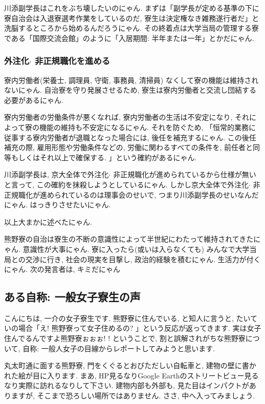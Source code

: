 \documentclass[10pt,b5jsbook,dvips,dvipdfmx,openany]{jsbook}
\theoremstyle{definition}
\begin{document}
			川添副学長はこれをぶち壊したいのにゃん. まずは「副学長が定める基準の下に寮自治会は入退寮選考作業をしているのだ, 寮生は決定権なき雑務遂行者だ」と洗脳するところから始めるんだろうにゃん. その終着点は大学当局の管理する寮である「国際交流会館」のように「入居期間: 半年または一年」とかだにゃん. 

			\subsubsection{外注化$ \cdot $ 非正規職化を進める}
			寮内労働者(栄養士, 調理員, 守衛, 事務員, 清掃員) なくして寮の機能は維持されないにゃん. 自治寮を守り発展させるため, 寮生は寮内労働者と交流し団結する必要があるにゃん. 

			寮内労働者の労働条件が悪くなれば, 寮内労働者の生活は不安定になり, それによって寮の機能の維持も不安定になるにゃん. それを防ぐため, 「恒常的業務に従事する寮内労働者が退職となった場合には, 後任を補充するにゃん. この後任補充の際, 雇用形態や労働条件などの, 労働に関わるすべての条件を, 前任者と同等もしくはそれ以上で確保する. 」という確約があるにゃん. 

			川添副学長は, 京大全体で外注化$ \cdot $ 非正規職化が進められているから仕様が無いと言って, この確約を抹殺しようとしているにゃん. しかし京大全体で外注化$ \cdot $ 非正規職化が進められているのは理事会のせいで, つまり川添副学長のせいなんだにゃん. はっきりさせたいにゃん. 

 			以上大まかに述べたにゃん. 

			熊野寮の自治は寮生の不断の意識性によって半世紀にわたって維持されてきたにゃん. 意識性が大事にゃん. 寮に入ったら(或いは入らなくても) みんなで大学当局との交渉に行き, 社会の現実を目撃し, 政治的経験を積むにゃん. 生活力が付くにゃん. 
次の発言者は, キミだにゃん



		\subsection{ある自称: 一般女子寮生の声}

		こんにちは, 一介の女子寮生です. 熊野寮に住んでいる, と知人に言うと, たいていの場合「え! 熊野寮って女子住めるの? 」という反応が返ってきます. 実は女子住んでるんですよ熊野寮ぉぉぉ! ! ということで, 割と誤解されがちな熊野寮について, 自称: 一般人女子の目線からレポートしてみようと思います. 

		丸太町通に面する熊野寮, 門をくぐるとおびただしい自転車と, 建物の壁に書かれた絵が目に入ります. まあ, HP見るなりGoogle Earthのストリートビュー見るなり実際に訪れるなりして下さい. 建物内部も外部も, 見た目はインパクトがありますが, そこまで恐ろしい場所ではありません. ささ, 中へ入ってみましょう. 
\end{document}
